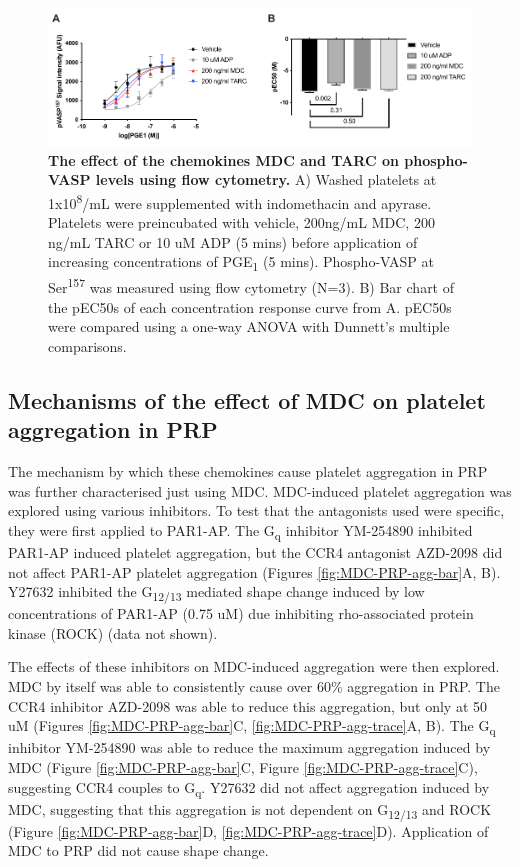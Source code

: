\documentclass[11pt,twoside]{bristolthesis}
\begin{document}
\begin{figure}
\includegraphics[width=0.9\linewidth]{figure/Chemokines/Layouts/MDC_TARC_VASP_FACS_logec50} \caption[The effect of the chemokines MDC and TARC on phospho-VASP levels using flow cytometry]{\textbf{The effect of the chemokines MDC and TARC on phospho-VASP levels using flow cytometry.} A) Washed platelets at 1x10\textsuperscript{8}/mL were supplemented with indomethacin and apyrase. Platelets were preincubated with vehicle, 200ng/mL MDC, 200 ng/mL TARC or 10 uM ADP (5 mins) before application of increasing concentrations of PGE\textsubscript{1} (5 mins). Phospho-VASP at Ser\textsuperscript{157} was measured using flow cytometry (N=3). B) Bar chart of the pEC50s of each concentration response curve from A. pEC50s were compared using a one-way ANOVA with Dunnett's multiple comparisons.}\label{fig:MDC-TARC-VASP-FACS}
\end{figure}
\hypertarget{mechanisms-of-the-effect-of-mdc-on-platelet-aggregation-in-prp}{%
\subsection{Mechanisms of the effect of MDC on platelet aggregation in PRP}\label{mechanisms-of-the-effect-of-mdc-on-platelet-aggregation-in-prp}}

The mechanism by which these chemokines cause platelet aggregation in PRP was further characterised just using MDC. MDC-induced platelet aggregation was explored using various inhibitors. To test that the antagonists used were specific, they were first applied to PAR1-AP. The G\textsubscript{q} inhibitor YM-254890 inhibited PAR1-AP induced platelet aggregation, but the CCR4 antagonist AZD-2098 did not affect PAR1-AP platelet aggregation (Figures \ref{fig:MDC-PRP-agg-bar}A, B). Y27632 inhibited the G\textsubscript{12/13} mediated shape change induced by low concentrations of PAR1-AP (0.75 uM) due inhibiting rho-associated protein kinase (ROCK) (data not shown).

The effects of these inhibitors on MDC-induced aggregation were then explored. MDC by itself was able to consistently cause over 60\% aggregation in PRP. The CCR4 inhibitor AZD-2098 was able to reduce this aggregation, but only at 50 uM (Figures \ref{fig:MDC-PRP-agg-bar}C, \ref{fig:MDC-PRP-agg-trace}A, B). The G\textsubscript{q} inhibitor YM-254890 was able to reduce the maximum aggregation induced by MDC (Figure \ref{fig:MDC-PRP-agg-bar}C, Figure \ref{fig:MDC-PRP-agg-trace}C), suggesting CCR4 couples to G\textsubscript{q}. Y27632 did not affect aggregation induced by MDC, suggesting that this aggregation is not dependent on G\textsubscript{12/13} and ROCK (Figure \ref{fig:MDC-PRP-agg-bar}D, \ref{fig:MDC-PRP-agg-trace}D). Application of MDC to PRP did not cause shape change.
\end{document}
